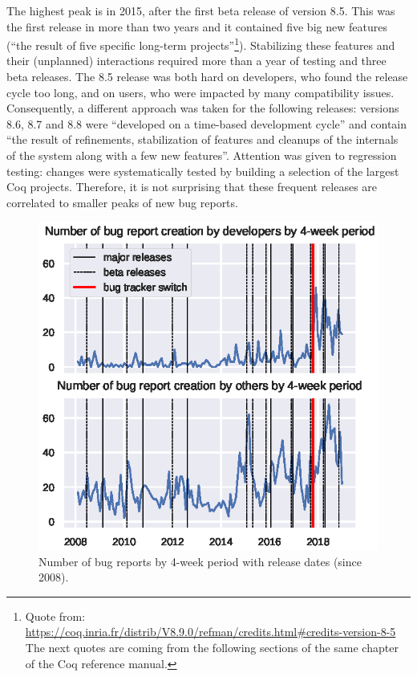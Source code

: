 \documentclass[conference]{IEEEtran}
\begin{document}
The highest peak is in 2015, after the first beta release of version 8.5. This was the first release in more than two years and it contained five big new features (``the result of five specific long-term projects''\footnote{Quote from:\\ \url{https://coq.inria.fr/distrib/V8.9.0/refman/credits.html\#credits-version-8-5}\\
The next quotes are coming from the following sections of the same chapter of the Coq reference manual.}). Stabilizing these features and their (unplanned) interactions required more than a year of testing and three beta releases. The 8.5 release was both hard on developers, who found the release cycle too long, and on users, who were impacted by many compatibility issues. Consequently, a different approach was taken for the following releases: versions 8.6, 8.7 and 8.8 were ``developed on a time-based development cycle'' and contain ``the result of refinements, stabilization of features and cleanups of the internals of the system along with a few new features''. Attention was given to regression testing: changes were systematically tested by building a selection of the largest Coq projects. Therefore, it is not surprising that these frequent releases are correlated to smaller peaks of new bug reports.

\begin{figure}
\includegraphics{bug_nb_with_releases.eps}
\caption{Number of bug reports by 4-week period with release dates (since 2008).} \label{bug_nb_with_releases}
\end{figure}
\end{document}
